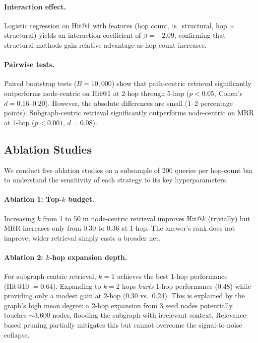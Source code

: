 \documentclass[11pt]{article}
\begin{document}
\paragraph{Interaction effect.} Logistic regression on Hit@1 with features (hop count, is\_structural, hop $\times$ structural) yields an interaction coefficient of $\beta = +2.09$, confirming that structural methods gain relative advantage as hop count increases.

\paragraph{Pairwise tests.} Paired bootstrap tests ($B = 10{,}000$) show that path-centric retrieval significantly outperforms node-centric on Hit@1 at 2-hop through 5-hop ($p < 0.05$, Cohen's $d = 0.16$--$0.20$). However, the absolute differences are small (1--2 percentage points). Subgraph-centric retrieval significantly outperforms node-centric on MRR at 1-hop ($p < 0.001$, $d = 0.08$).

\subsection{Ablation Studies}

We conduct five ablation studies on a subsample of 200 queries per hop-count bin to understand the sensitivity of each strategy to its key hyperparameters.

\paragraph{Ablation 1: Top-$k$ budget.} Increasing $k$ from 1 to 50 in node-centric retrieval improves Hit@$k$ (trivially) but MRR increases only from 0.30 to 0.36 at 1-hop. The answer's rank does not improve; wider retrieval simply casts a broader net.

\paragraph{Ablation 2: $k$-hop expansion depth.} For subgraph-centric retrieval, $k = 1$ achieves the best 1-hop performance (Hit@10 $= 0.64$). Expanding to $k = 2$ hops \textit{hurts} 1-hop performance (0.48) while providing only a modest gain at 2-hop (0.30 vs.\ 0.24). This is explained by the graph's high mean degree: a 2-hop expansion from 3 seed nodes potentially touches $\sim$3,600 nodes, flooding the subgraph with irrelevant context. Relevance-based pruning partially mitigates this but cannot overcome the signal-to-noise collapse.
\end{document}
